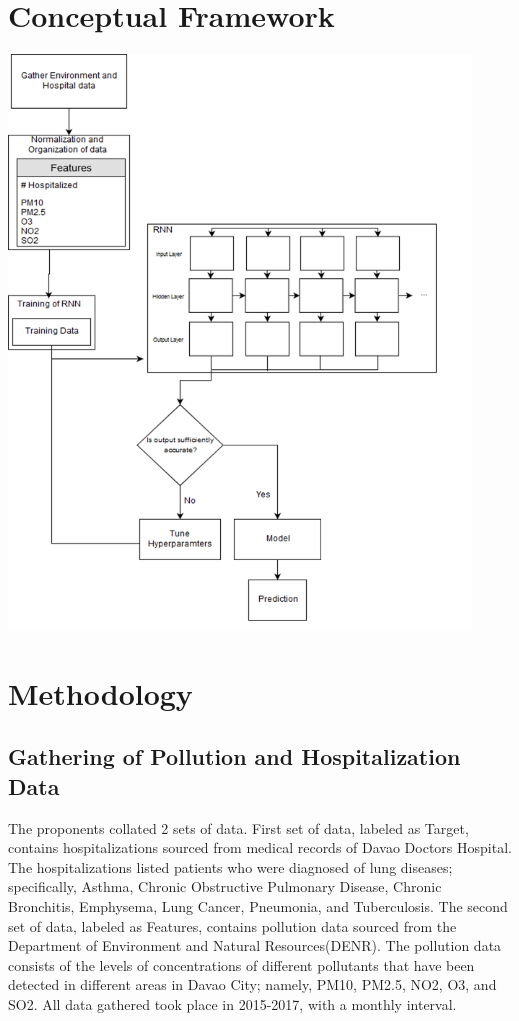 \documentclass[10pt,11pt,12pt,oneside]{book}
\begin{document}
\section{Conceptual Framework}
\includegraphics[height=6in]{conframework.png}
\section{Methodology}
    \subsection{Gathering of Pollution and Hospitalization Data}
    The proponents collated 2 sets of data. First set of data, labeled as Target, contains hospitalizations sourced from medical records of Davao Doctors Hospital. The hospitalizations listed patients who were diagnosed of lung diseases; specifically, Asthma, Chronic Obstructive Pulmonary Disease, Chronic Bronchitis, Emphysema, Lung Cancer, Pneumonia, and Tuberculosis. The second set of data, labeled as Features, contains pollution data sourced from the Department of Environment and Natural
    Resources(DENR). The pollution data consists of the levels of concentrations of different pollutants that have been detected in different areas in Davao City; namely, PM10, PM2.5, NO2, O3, and SO2. All data gathered took place in 2015-2017, with a monthly interval.  
\end{document}
